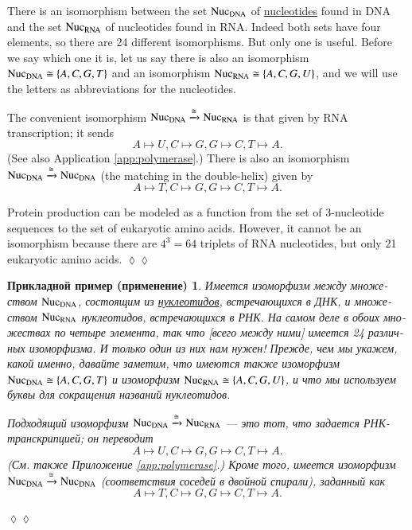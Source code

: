 \documentclass[a4paper]{book}
\def\tn{\textnormal}
\def\iso{\cong}
\newcommand{\To}[1]{\xrightarrow{#1}}
\theoremstyle{myth}
\newtheorem{appENG}[envENG]{\begin{english}Application\end{english}}
\newenvironment{applicationENG}{\begin{appENG}}{\hspace*{\fill}$\lozenge\lozenge$\end{appENG}}
\newtheorem{appRUS}[envRUS]{Прикладной пример (применение)}
\newenvironment{applicationRUS}{\begin{appRUS}}{\hspace*{\fill}$\lozenge\lozenge$\end{appRUS}}
\begin{document}
\begin{russian}
\begin{applicationENG}\label{app:DNA RNA}
There is an isomorphism between the set $\tn{Nuc}_\tn{DNA}$ of \href{http://en.wikipedia.org/wiki/Nucleotides}{\text nucleotides} found in DNA and the set $\tn{Nuc}_\tn{RNA}$ of nucleotides found in RNA. Indeed both sets have four elements, so there are 24 different isomorphisms. But only one is useful. Before we say which one it is, let us say there is also an isomorphism $\tn{Nuc}_\tn{DNA}\iso\{A,C,G,T\}$ and an isomorphism $\tn{Nuc}_\tn{RNA}\iso\{A,C,G,U\}$, and we will use the letters as abbreviations for the nucleotides. 

The convenient isomorphism $\tn{Nuc}_\tn{DNA}\To{\iso}\tn{Nuc}_\tn{RNA}$ is that given by RNA transcription; it sends 
$$A\mapsto U, C\mapsto G, G\mapsto C, T\mapsto A.$$ 
(See also Application \ref{app:polymerase}.) There is also an isomorphism $\tn{Nuc}_\tn{DNA}\To{\iso}\tn{Nuc}_\tn{DNA}$ (the matching in the double-helix) given by 
$$A\mapsto T, C\mapsto G, G\mapsto C, T\mapsto A.$$

Protein production can be modeled as a function from the set of 3-nucleotide sequences to the set of eukaryotic amino acids. However, it cannot be an isomorphism because there are $4^3=64$ triplets of RNA nucleotides, but only 21 eukaryotic amino acids. 
\end{applicationENG}

\begin{applicationRUS}\label{app:DNA RNA}
Имеется изоморфизм между множеством $\tn{Nuc}_\tn{DNA}$, состоящим из  \href{https://ru.wikipedia.org/wiki/%D0%9D%D1%83%D0%BA%D0%BB%D0%B5%D0%BE%D1%82%D0%B8%D0%B4%D1%8B}{\text нуклеотидов}, встречающихся в ДНК, и множеством $\tn{Nuc}_\tn{RNA}$ нуклеотидов, встречающихся в РНК. На самом деле в обоих множествах по четыре элемента, так что [всего между ними] имеется 24 различных изоморфизма. И только один из них нам нужен! Прежде, чем мы укажем, какой именно, давайте заметим, что имеются также изоморфизм $\tn{Nuc}_\tn{DNA}\iso\{A,C,G,T\}$ и изоморфизм $\tn{Nuc}_\tn{RNA}\iso\{A,C,G,U\}$, и что мы используем буквы для сокращения названий нуклеотидов. 

Подходящий изоморфизм $\tn{Nuc}_\tn{DNA}\To{\iso}\tn{Nuc}_\tn{RNA}$ — это тот, что задается РНК-транскрипцией; он переводит
$$A\mapsto U, C\mapsto G, G\mapsto C, T\mapsto A.$$ 
(См. также Приложение \ref{app:polymerase}.) Кроме того, имеется изоморфизм $\tn{Nuc}_\tn{DNA}\To{\iso}\tn{Nuc}_\tn{DNA}$ (соответствия соседей в двойной спирали), заданный как  
$$A\mapsto T, C\mapsto G, G\mapsto C, T\mapsto A.$$


\end{applicationRUS}
\end{russian}
\end{document}

